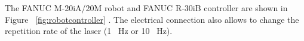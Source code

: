 The  FANUC M-20iA/20M robot and FANUC R-30iB controller are shown in Figure~ \ref{fig:robotcontroller} \cite{fanucrobotcontroller}. The electrical connection also allows to change the repetition rate of the laser (1 \SI{}{\hertz} or 10 \SI{}{\hertz}).

